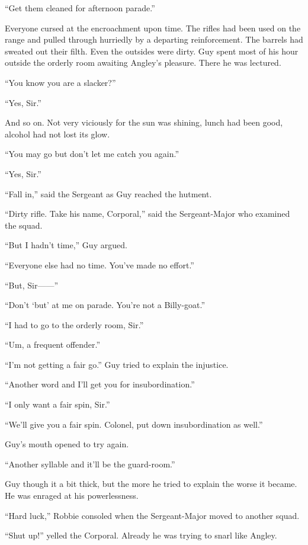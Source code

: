 ``Get them cleaned for afternoon parade.''

Everyone cursed at the encroachment upon time. The rifles had been used 
on the range and pulled through hurriedly by a departing reinforcement. 
The barrels had sweated out their filth. Even the outsides were dirty. 
Guy spent most of his hour outside the orderly room awaiting Angley's 
pleasure. There he was lectured.

``You know you are a slacker?''

``Yes, Sir.''

And so on. Not very viciously for the sun was shining, lunch had been 
good, alcohol had not lost its glow.

``You may go but don't let me catch you again.''

``Yes, Sir.''

``Fall in,'' said the Sergeant as Guy reached the hutment.

``Dirty rifle. Take his name, Corporal,'' said the Sergeant-Major who 
examined the squad.

``But I hadn't time,'' Guy argued.

``Everyone else had no time. You've made no effort.''

``But, Sir------''

``Don't `but' at me on parade. You're not a Billy-goat.''

``I had to go to the orderly room, Sir.''

``Um, a frequent offender.''

``I'm not getting a fair go.'' Guy tried to explain the injustice.

``Another word and I'll get you for insubordination.''

``I only want a fair spin, Sir.''

``We'll give you a fair spin. Colonel, put down insubordination as well.''

Guy's mouth opened to try again.

``Another syllable and it'll be the guard-room.''

Guy though it a bit thick, but the more he tried to explain the 
worse it became. He was enraged at his powerlessness.

``Hard luck,'' Robbie consoled when the Sergeant-Major moved to 
another squad.

``Shut up!'' yelled the Corporal. Already he was trying to snarl 
like Angley.